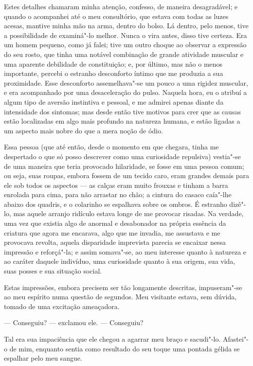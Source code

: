 Estes detalhes chamaram minha atenção, confesso, de maneira
desagradável; e quando o acompanhei até o meu consultório, que estava
com todas as luzes acesas, mantive minha mão na arma, dentro do bolso. 
Lá dentro, pelo menos, tive a possibilidade de examiná"-lo melhor. 
Nunca o vira antes, disso tive certeza.  Era um homem pequeno, como já
falei; tive um outro choque ao observar a expressão do seu rosto, que
tinha uma notável combinação de grande atividade muscular e uma
aparente debilidade de constituição; e, por último, mas não o menos
importante, percebi o estranho desconforto íntimo que me produzia a sua
proximidade.  Esse desconforto assemelhava"-se um pouco a uma rigidez
muscular, e era acompanhado por uma desaceleração do pulso.  Naquela
hora, eu o atribuí a algum tipo de aversão instintiva e pessoal, e me
admirei apenas diante da intensidade dos sintomas; mas desde então tive
motivos para crer que as causas estão localizadas em algo mais
profundo na natureza humana, e estão ligadas a um aspecto mais nobre do
que a mera noção de ódio.

Essa pessoa (que até então, desde o momento em que chegara, tinha me
despertado o que só posso descrever como uma curiosidade repulsiva) 
vestia"-se de uma maneira que teria provocado hilaridade, se
fosse em uma pessoa comum; ou seja, suas roupas, embora fossem de um
tecido caro, eram grandes demais para ele sob todos os aspectos --- as
calças eram muito frouxas e tinham a barra enrolada para cima, para não
arrastar no chão; a cintura do casaco caía"-lhe abaixo dos quadris, e o
colarinho se espalhava sobre os ombros.  É estranho dizê"-lo, mas aquele
arranjo ridículo estava longe de me provocar risadas.  Na verdade, uma
vez que existia algo de anormal e desabonador na própria essência da
criatura que agora me encarava, algo que me invadia, me assustava e me
provocava revolta, aquela disparidade imprevista parecia se encaixar
nessa impressão e reforçá"-la; e assim somava"-se, ao meu interesse
quanto à natureza e ao caráter daquele indivíduo, uma curiosidade
quanto à sua origem, sua vida, suas posses e sua situação social.

Estas impressões, embora precisem ser tão longamente descritas,
impuseram"-se ao meu espírito numa questão de segundos.  Meu visitante
estava, sem dúvida, tomado de uma excitação ameaçadora. 

--- Conseguiu? --- exclamou ele. --- Conseguiu? 

Tal era sua impaciência que ele chegou a agarrar meu braço e sacudi"-lo. 
Afastei"-o de mim, enquanto sentia como resultado do seu toque uma
pontada gélida se espalhar pelo meu sangue.

